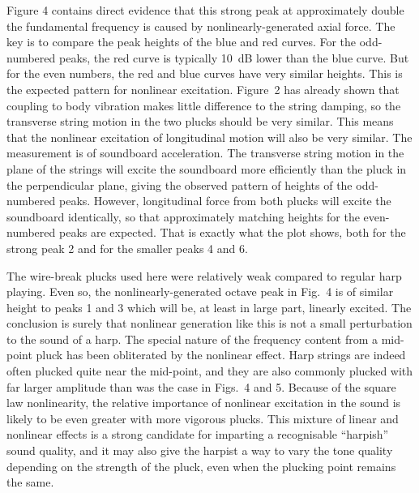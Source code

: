   Figure 4 contains direct evidence that this strong peak at approximately 
  double the fundamental frequency is caused by nonlinearly-generated axial 
  force. The key is to compare the peak heights of the blue and red curves. For 
  the odd-numbered peaks, the red curve is typically 10~dB lower than the blue 
  curve. But for the even numbers, the red and blue curves have very similar 
  heights. This is the expected pattern for nonlinear excitation. Figure~2 has 
  already shown that coupling to body vibration makes little difference to the 
  string damping, so the transverse string motion in the two plucks should be 
  very similar. This means that the nonlinear excitation of longitudinal motion 
  will also be very similar. The measurement is of soundboard acceleration. The 
  transverse string motion in the plane of the strings will excite the 
  soundboard more efficiently than the pluck in the perpendicular plane, giving 
  the observed pattern of heights of the odd-numbered peaks. However, 
  longitudinal force from both plucks will excite the soundboard identically, 
  so that approximately matching heights for the even-numbered peaks are 
  expected. That is exactly what the plot shows, both for the strong peak 2 and 
  for the smaller peaks 4 and 6. 

  The wire-break plucks used here were relatively weak compared to regular harp 
  playing. Even so, the nonlinearly-generated octave peak in Fig.\ 4 is of 
  similar height to peaks 1 and 3 which will be, at least in large part, 
  linearly excited. The conclusion is surely that nonlinear generation like 
  this is not a small perturbation to the sound of a harp. The special nature 
  of the frequency content from a mid-point pluck has been obliterated by the 
  nonlinear effect. Harp strings are indeed often plucked quite near the 
  mid-point, and they are also commonly plucked with far larger amplitude than 
  was the case in Figs.\ 4 and 5. Because of the square law nonlinearity, the 
  relative importance of nonlinear excitation in the sound is likely to be even 
  greater with more vigorous plucks. This mixture of linear and nonlinear 
  effects is a strong candidate for imparting a recognisable “harpish” sound 
  quality, and it may also give the harpist a way to vary the tone quality 
  depending on the strength of the pluck, even when the plucking point remains 
  the same. 


